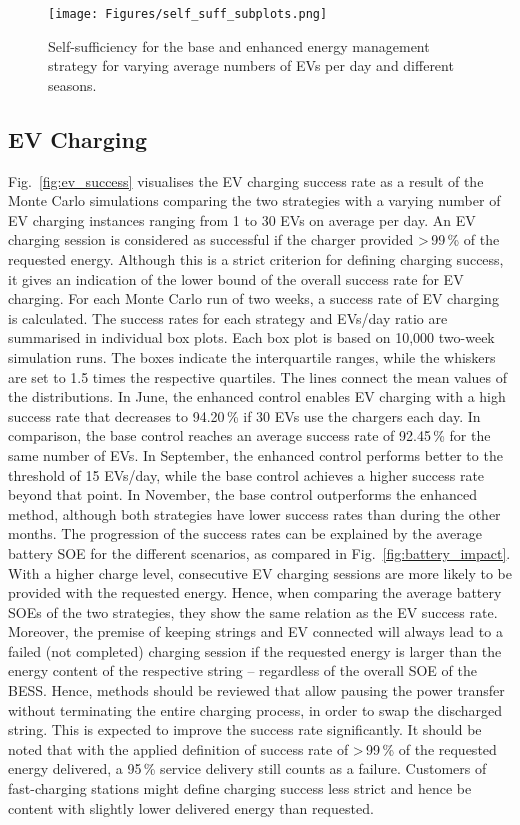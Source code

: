 \documentclass[final,5p,times,twocolumn]{elsarticle}
\begin{document}
\begin{figure*}[t!]
    \centering
    \texttt{[image: Figures/self\_suff\_subplots.png]}
    \caption{Self-sufficiency for the base and enhanced energy management strategy for varying average numbers of EVs per day and different seasons.}
    \label{fig:self_sufficiency}
\end{figure*}

\subsection{EV Charging}

Fig.~\ref{fig:ev_success} visualises the EV charging success rate as a result of the Monte Carlo simulations comparing the two strategies with a varying number of EV charging instances ranging from 1 to 30 EVs on average per day. An EV charging session is considered as successful if the charger provided \textgreater\,99\,\% of the requested energy. Although this is a strict criterion for defining charging success, it gives an indication of the lower bound of the overall success rate for EV charging. For each Monte Carlo run of two weeks, a success rate of EV charging is calculated. The success rates for each strategy and EVs/day ratio are summarised in individual box plots. Each box plot is based on 10,000 two-week simulation runs. The boxes indicate the interquartile ranges, while the whiskers are set to 1.5 times the respective quartiles. The lines connect the mean values of the distributions. In June, the enhanced control enables EV charging with a high success rate that decreases to 94.20\,\% if 30 EVs use the chargers each day. In comparison, the base control reaches an average success rate of 92.45\,\% for the same number of EVs. In September, the enhanced control performs better to the threshold of 15 EVs/day, while the base control achieves a higher success rate beyond that point. In November, the base control outperforms the enhanced method, although both strategies have lower success rates than during the other months. The progression of the success rates can be explained by the average battery SOE for the different scenarios, as compared in Fig.~\ref{fig:battery_impact}. With a higher charge level, consecutive EV charging sessions are more likely to be provided with the requested energy. Hence, when comparing the average battery SOEs of the two strategies, they show the same relation as the EV success rate. Moreover, the premise of keeping strings and EV connected will always lead to a failed (not completed) charging session if the requested energy is larger than the energy content of the respective string -- regardless of the overall SOE of the BESS. Hence, methods should be reviewed that allow pausing the power transfer without terminating the entire charging process, in order to swap the discharged string. This is expected to improve the success rate significantly. It should be noted that with the applied definition of success rate of \textgreater\,99\,\% of the requested energy delivered, a 95\,\% service delivery still counts as a failure. Customers of fast-charging stations might define charging success less strict and hence be content with slightly lower delivered energy than requested.
\end{document}
